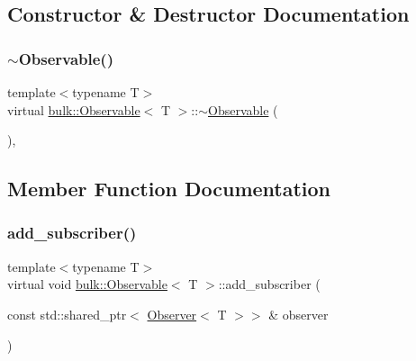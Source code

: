 \subsection{Constructor \& Destructor Documentation}
\mbox{\label{classbulk_1_1Observable_a4927059b909f8116927eb5275698153d}} 
\subsubsection{\texorpdfstring{$\sim$\+Observable()}{~Observable()}}
{\footnotesize\ttfamily template$<$typename T$>$ \\
virtual \hyperlink{classbulk_1_1Observable}{bulk\+::\+Observable}$<$ T $>$\+::$\sim$\hyperlink{classbulk_1_1Observable}{Observable} (\begin{DoxyParamCaption}{ }\end{DoxyParamCaption})\hspace{0.3cm}{\ttfamily [virtual]}, {\ttfamily [default]}}



\subsection{Member Function Documentation}
\mbox{\label{classbulk_1_1Observable_a1d014ef91398bff19bf96d9ef6bd5e10}} 
\subsubsection{\texorpdfstring{add\+\_\+subscriber()}{add\_subscriber()}}
{\footnotesize\ttfamily template$<$typename T$>$ \\
virtual void \hyperlink{classbulk_1_1Observable}{bulk\+::\+Observable}$<$ T $>$\+::add\+\_\+subscriber (\begin{DoxyParamCaption}\item[{const std\+::shared\+\_\+ptr$<$ \hyperlink{classbulk_1_1Observer}{Observer}$<$ T $>$$>$ \&}]{observer }\end{DoxyParamCaption})\hspace{0.3cm}{\ttfamily [pure virtual]}}



